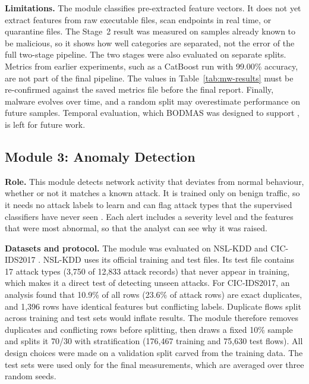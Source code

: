 \textbf{Limitations.} The module classifies pre-extracted feature vectors. It does not yet extract features from raw executable files, scan endpoints in real time, or quarantine files. The Stage~2 result was measured on samples already known to be malicious, so it shows how well categories are separated, not the error of the full two-stage pipeline. The two stages were also evaluated on separate splits. Metrics from earlier experiments, such as a CatBoost run with 99.00\% accuracy, are not part of the final pipeline. The values in Table~\ref{tab:mw-results} must be re-confirmed against the saved metrics file before the final report. Finally, malware evolves over time, and a random split may overestimate performance on future samples. Temporal evaluation, which BODMAS was designed to support \cite{yang2021bodmas}, is left for future work.

\subsection{Module 3: Anomaly Detection}

\textbf{Role.} This module detects network activity that deviates from normal behaviour, whether or not it matches a known attack. It is trained only on benign traffic, so it needs no attack labels to learn and can flag attack types that the supervised classifiers have never seen \cite{chandola2009anomaly,ahmed2016anomaly}. Each alert includes a severity level and the features that were most abnormal, so that the analyst can see why it was raised.

\textbf{Datasets and protocol.} The module was evaluated on NSL-KDD \cite{tavallaee2009nslkdd} and CIC-IDS2017 \cite{sharafaldin2018cicids}. NSL-KDD uses its official training and test files. Its test file contains 17 attack types (3,750 of 12,833 attack records) that never appear in training, which makes it a direct test of detecting unseen attacks. For CIC-IDS2017, an analysis found that 10.9\% of all rows (23.6\% of attack rows) are exact duplicates, and 1,396 rows have identical features but conflicting labels. Duplicate flows split across training and test sets would inflate results. The module therefore removes duplicates and conflicting rows before splitting, then draws a fixed 10\% sample and splits it 70/30 with stratification (176,467 training and 75,630 test flows). All design choices were made on a validation split carved from the training data. The test sets were used only for the final measurements, which are averaged over three random seeds.

